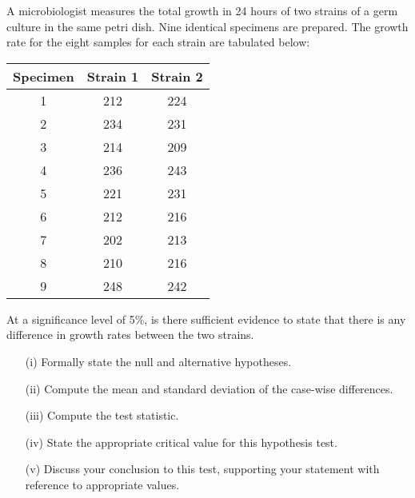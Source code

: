 \item A microbiologist measures the total growth in 24 hours of two strains of a germ culture  in the same petri dish. Nine identical specimens are prepared. The growth rate for the eight samples for each strain are tabulated below:

\begin{center}
	\begin{tabular}{|c|c|c|} \hline 
		Specimen &	Strain 1	&	Strain 2	\\ \hline \hline
		1 & 212 & 224 \\ \hline
		2 & 234 & 231 \\ \hline
		3 & 214 & 209 \\ \hline
		4 & 236 & 243 \\ \hline
		5 & 221 & 231 \\ \hline 
		6 & 212 & 216 \\ \hline
		7 & 202 & 213 \\ \hline 
		8 & 210 & 216 \\ \hline
		9 & 248 & 242 \\ \hline
	\end{tabular} 
\end{center}
\noindent At a significance level of 5\%, is there sufficient evidence to state that there is any difference in growth rates between the two strains.




\begin{itemize}
\item[(i)] Formally state the null and alternative hypotheses.
\item[(ii)]  Compute the mean and standard deviation of the case-wise differences.
\item[(iii)] Compute the test statistic.
\item[(iv)] State the appropriate critical value for this hypothesis test.
\item[(v)] Discuss your conclusion to this test, supporting your statement with reference to appropriate values.
\end{itemize}


